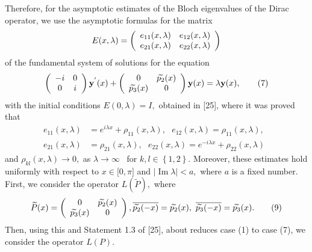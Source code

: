 \documentclass{article}%
\begin{document}
Therefore, for the asymptotic estimates of the Bloch eigenvalues of the Dirac
operator, we use the asymptotic formulas for the matrix
\[
E(x,\lambda)=\left(
\begin{array}
[c]{cc}%
e_{11}(x,\lambda) & e_{12}(x,\lambda)\\
e_{21}(x,\lambda) & e_{22}(x,\lambda)
\end{array}
\right)
\]
of the fundamental system of solutions for the equation
\begin{equation}
\left(
\begin{array}
[c]{cc}%
-i & 0\\
0 & i
\end{array}
\right)  \mathbf{y}^{^{\prime}}(x)+\left(
\begin{array}
[c]{cc}%
0 & \widetilde{p_{2}}(x)\\
\widetilde{p_{3}}(x) & 0
\end{array}
\right)  \mathbf{y}(x)=\lambda\mathbf{y}(x), \tag{7}%
\end{equation}
with the initial conditions $E(0,\lambda)=I,$ obtained in [25], where it was
proved that
\begin{align}
e_{11}(x,\lambda)  &  =e^{i\lambda x}+\rho_{11}(x,\lambda),\text{ }%
e_{12}(x,\lambda)=\rho_{11}(x,\lambda),\text{ }\tag{8}\\
e_{21}(x,\lambda)  &  =\rho_{21}(x,\lambda),\text{ }e_{22}(x,\lambda
)=e^{-i\lambda x}+\rho_{22}(x,\lambda)\nonumber
\end{align}
and $\rho_{kl}(x,\lambda)\rightarrow0,$ as $\lambda\rightarrow\infty$ \ for
$k,l\in\left\{  1,2\right\}  .$ Moreover, these estimates hold uniformly with
respect to $x\in\lbrack0,\pi]$ and $\left\vert \operatorname{Im}%
\lambda\right\vert <a,$ where $a$ is a fixed number. First, we consider the
operator $L\left(  \widetilde{P}\right)  ,$ where
\begin{equation}
\widetilde{P}(x)=\left(
\begin{array}
[c]{cc}%
0 & \widetilde{p_{2}}(x)\\
\widetilde{p_{3}}(x) & 0
\end{array}
\right)  ,\overline{\widetilde{p_{2}}(-x)}=\widetilde{p_{2}}(x),\text{
}\overline{\widetilde{p_{3}}(-x)}=\widetilde{p_{3}}(x). \tag{9}%
\end{equation}
Then, using this and Statement 1.3 of [25], about reduces case (1) to case
(7), we consider the operator $L(P).$
\end{document}
